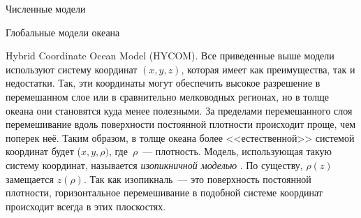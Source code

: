 \begin{chapter}{Численные модели}
\begin{section}{Глобальные модели океана}
\begin{paragraph}{Hybrid Coordinate Ocean Model (HYCOM).}
%
Все приведенные выше модели используют систему координат $(x, y, z)$, которая
имеет как преимущества, так и недостатки. Так, эти координаты могут 
обеспечить высокое разрешение в перемешанном слое или в сравнительно 
мелководных регионах, но в толще океана они становятся куда менее полезными.
За пределами перемешанного слоя перемешивание%
 вдоль поверхности
постоянной плотности происходит проще, чем поперек неё.
Таким образом, в толще океана более <<естественной>> системой координат 
будет ($x, y, \rho)$, где~$\rho$~--- плотность. Модель, использующая такую 
систему координат, называется \emph{изопикничной моделью}%
. 
По существу, $\rho(z)$ замещается $z(\rho)$. 
Так как изопикналь~--- это поверхность постоянной плотности,
горизонтальное перемешивание в
подобной системе координат происходит всегда в этих плоскостях.
%


\end{paragraph}
\end{section}
\end{chapter}
